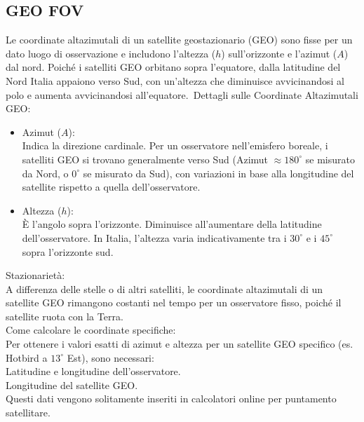 \documentclass[a4paper,14pt]{article}
\begin{document}
\subsection{GEO FOV}
Le coordinate altazimutali di un satellite geostazionario (GEO) sono fisse per un dato luogo di osservazione e includono l'altezza (\(h\)) sull'orizzonte e l'azimut (\(A\)) dal nord. Poiché i satelliti GEO orbitano sopra l'equatore, dalla latitudine del Nord Italia appaiono verso Sud, con un'altezza che diminuisce avvicinandosi al polo e aumenta avvicinandosi all'equatore. Dettagli sulle Coordinate Altazimutali GEO:\\
\begin{itemize}
\item Azimut (\(A\)):\\
Indica la direzione cardinale. Per un osservatore nell'emisfero boreale, i satelliti GEO si trovano generalmente verso Sud (Azimut \(\approx 180^{\circ }\) se misurato da Nord, o \(0^{\circ }\) se misurato da Sud), con variazioni in base alla longitudine del satellite rispetto a quella dell'osservatore.\\
\item Altezza (\(h\)):\\
È l'angolo sopra l'orizzonte. Diminuisce all'aumentare della latitudine dell'osservatore. In Italia, l'altezza varia indicativamente tra i \(30^{\circ }\) e i \(45^{\circ }\) sopra l'orizzonte sud.\\
\end{itemize}
Stazionarietà:\\
A differenza delle stelle o di altri satelliti, le coordinate altazimutali di un satellite GEO rimangono costanti nel tempo per un osservatore fisso, poiché il satellite ruota con la Terra.\\
Come calcolare le coordinate specifiche:\\
Per ottenere i valori esatti di azimut e altezza per un satellite GEO specifico (es. Hotbird a \(13^{\circ }\) Est), sono necessari:\\
Latitudine e longitudine dell'osservatore.\\
Longitudine del satellite GEO.\\
Questi dati vengono solitamente inseriti in calcolatori online per puntamento satellitare.
\end{document}
